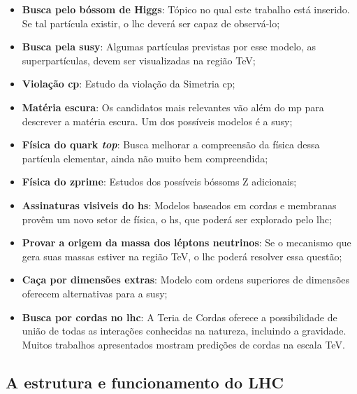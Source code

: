 \begin{itemize}
\item \textbf{Busca pelo bóssom de Higgs}: Tópico no qual este trabalho está
inserido. Se tal partícula existir, o \gls{lhc} deverá ser capaz de observá-lo;
\item \textbf{Busca pela \gls{susy}}: Algumas partículas previstas por esse modelo, as superpartículas, 
devem ser visualizadas na região TeV;
\item \textbf{Violação \gls{cp}}: Estudo da violação da Simetria \gls{cp};
\item \textbf{Matéria escura}: Os candidatos mais relevantes vão além do \gls{mp}
para descrever a matéria escura. Um dos possíveis modelos é a \gls{susy};
\item \textbf{Física do quark \emph{top}}: Busca melhorar a compreensão da física dessa
partícula elementar, ainda não muito bem compreendida;
\item \textbf{Física do \gls{zprime}}: Estudos dos possíveis bóssoms Z adicionais; 
\item \textbf{Assinaturas visiveis do \gls{hs}}: Modelos baseados em
cordas e membranas provêm um novo setor de física, o \gls{hs}, que poderá ser
explorado pelo \gls{lhc};
\item \textbf{Provar a origem da massa dos léptons neutrinos}: Se o mecanismo que gera
suas massas estiver na região TeV, o \gls{lhc} poderá resolver essa questão;
\item \textbf{Caça por dimensões extras}: Modelo com ordens superiores de dimensões
oferecem alternativas para a \gls{susy};
\item \textbf{Busca por cordas no \gls{lhc}}: A Teria de Cordas oferece a possibilidade de
união de todas as interações conhecidas na natureza, incluindo a gravidade. Muitos
trabalhos apresentados mostram predições de cordas na escala TeV.
\end{itemize}

\subsection{A estrutura e funcionamento do LHC}
\label{ssec:struct_lhc}


